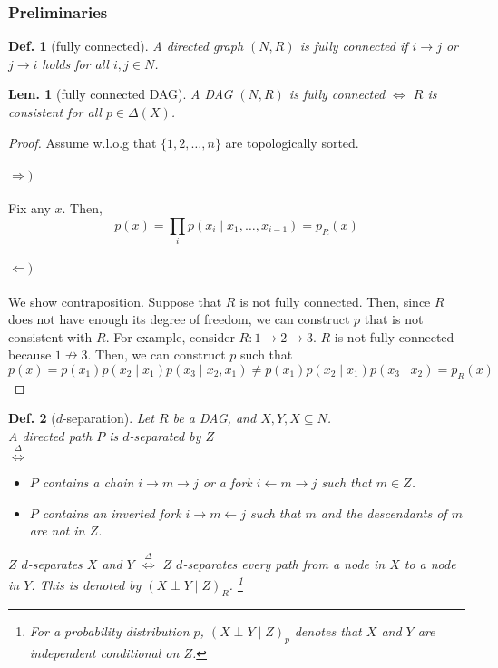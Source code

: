 \documentclass[11pt,a4paper,dvipdfmx]{article}
\theoremstyle{plain}
\newtheorem{lem}{Lem.}[section]
\newtheorem{df}{Def.}[section]
\newcommand{\defi}{\stackrel{\Delta}{\Longleftrightarrow}}
\newcommand{\equi}{\Longleftrightarrow}
\begin{document}
\subsubsection{Preliminaries}
\begin{df}[fully connected]
	A directed graph $(N, R)$ is fully connected if $i \to j$ or $j \to i$ holds for all $i, j \in N$.
\end{df}
\begin{lem}[fully connected DAG]
	A DAG $(N, R)$ is fully connected $\equi$ $R$ is consistent for all $p \in \Delta(X)$.
\end{lem}
\begin{proof}
	Assume w.l.o.g that $\{1,2,\dots, n\}$ are topologically sorted.
	\paragraph{$\Rightarrow)$}
	Fix any $x$. Then, 
	\[
	p(x) = \prod_i p(x_i \mid x_1, \dots, x_{i-1}) = p_R(x)
	\]
	
	\paragraph{$\Leftarrow)$}
	We show contraposition. Suppose that $R$ is not fully connected. Then, since $R$ does not have enough its degree of freedom, we can construct $p$ that is not consistent with $R$. For example, consider $R: 1 \to 2 \to 3$. $R$ is not fully connected because $1 \nrightarrow 3$. Then, we can construct $p$ such that
	\[
	p(x) = p(x_1)p(x_2 \mid x_1) p(x_3 \mid x_2, x_1) \neq p(x_1) p(x_2 \mid x_1) p(x_3 \mid x_2) = p_R(x)
	\]
\end{proof}

\begin{df}[$d$-separation] Let $R$ be a DAG, and $X,Y,X \subseteq N$. \\
	A directed path $P$ is $d$-separated by $Z$ \\
	$\defi$
	\begin{itemize}
		\item $P$ contains a chain $i \to m \to j$ or a fork $i \leftarrow m \to j$ such that $m \in Z$.
		\item $P$ contains an inverted fork $i \to m \leftarrow j$ such that $m$ and the descendants of $m$ are not in $Z$.
	\end{itemize}
	$Z$ $d$-separates $X$ and $Y$ $\defi$ $Z$ $d$-separates every path from a node in $X$ to a node in $Y$. This is denoted by $(X \perp Y \mid Z)_R$.
	\footnote{For a probability distribution $p$, $(X \perp Y \mid Z)_p$ denotes that $X$ and $Y$ are independent conditional on $Z$.}
\end{df}
\end{document}
